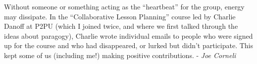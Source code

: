 Without someone or something acting as the ``heartbeat'' for the group,
energy may dissipate. In the ``Collaborative Lesson Planning'' course
led by Charlie Danoff at P2PU (which I joined twice, and where we first
talked through the ideas about paragogy), Charlie wrote individual
emails to people who were signed up for the course and who had
disappeared, or lurked but didn't participate. This kept some of us
(including me!) making positive contributions. - \emph{Joe Corneli}
